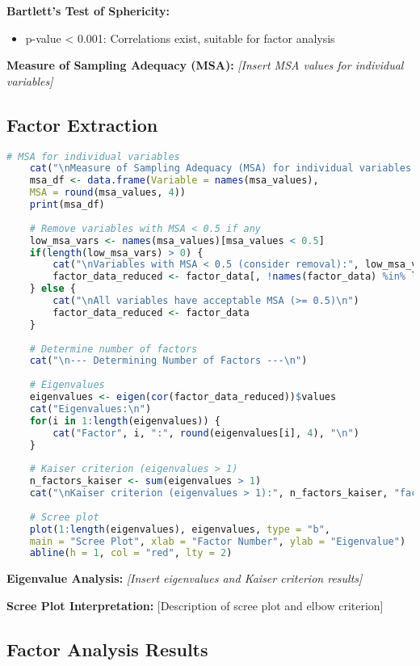 \textbf{Bartlett's Test of Sphericity:}
\begin{itemize}
	\item p-value < 0.001: Correlations exist, suitable for factor analysis
\end{itemize}

\textbf{Measure of Sampling Adequacy (MSA):}
\textit{[Insert MSA values for individual variables]}

\subsection{Factor Extraction}

\begin{lstlisting}[language=R, caption=Determining Number of Factors, breaklines=true]
	# MSA for individual variables
	cat("\nMeasure of Sampling Adequacy (MSA) for individual variables:\n")
	msa_df <- data.frame(Variable = names(msa_values), 
	MSA = round(msa_values, 4))
	print(msa_df)
	
	# Remove variables with MSA < 0.5 if any
	low_msa_vars <- names(msa_values)[msa_values < 0.5]
	if(length(low_msa_vars) > 0) {
		cat("\nVariables with MSA < 0.5 (consider removal):", low_msa_vars, "\n")
		factor_data_reduced <- factor_data[, !names(factor_data) %in% low_msa_vars]
	} else {
		cat("\nAll variables have acceptable MSA (>= 0.5)\n")
		factor_data_reduced <- factor_data
	}
	
	# Determine number of factors
	cat("\n--- Determining Number of Factors ---\n")
	
	# Eigenvalues
	eigenvalues <- eigen(cor(factor_data_reduced))$values
	cat("Eigenvalues:\n")
	for(i in 1:length(eigenvalues)) {
		cat("Factor", i, ":", round(eigenvalues[i], 4), "\n")
	}
	
	# Kaiser criterion (eigenvalues > 1)
	n_factors_kaiser <- sum(eigenvalues > 1)
	cat("\nKaiser criterion (eigenvalues > 1):", n_factors_kaiser, "factors\n")
	
	# Scree plot
	plot(1:length(eigenvalues), eigenvalues, type = "b",
	main = "Scree Plot", xlab = "Factor Number", ylab = "Eigenvalue")
	abline(h = 1, col = "red", lty = 2)
\end{lstlisting}

\textbf{Eigenvalue Analysis:}
\textit{[Insert eigenvalues and Kaiser criterion results]}

\textbf{Scree Plot Interpretation:}
[Description of scree plot and elbow criterion]

\subsection{Factor Analysis Results}

